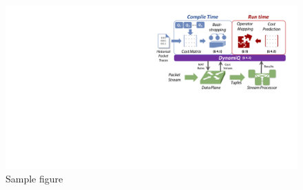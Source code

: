 \begin{figure}[t] 
\includegraphics[width=\linewidth]{dynamiq-nutshell.pdf}
\caption{{Sample figure~\cite{sonata}} \label{fig:dynamiq-nutshell}
}
\vspace{-.15in}
\end{figure}
